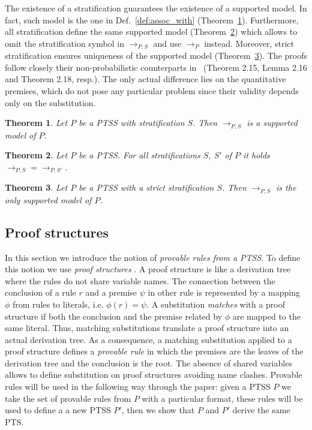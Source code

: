 \documentclass[submission,copyright,creativecommons]{eptcs}
\newtheorem{theorem}{Theorem}
\newcommand{\trans}[1][]{\xrightarrow{\, {#1} \, }}
\begin{document}
The  existence of a stratification guarantees the existence of a
supported model. In fact, such model is the one in
Def.~\ref{def:assoc_with} (Theorem~\ref{th:existence:supmodel}). Furthermore,
all stratification define the same supported model (Theorem~\ref{th:weakunicity:supmodel}) which allows to omit the stratification
symbol in ${\trans_{P, S}}$ and use ${\trans_{P}}$ instead. Moreover, 
strict stratification ensures uniqueness of the supported model 
(Theorem~\ref{th:strongunicity:supmodel}). The proofs follow closely
their non-probabilistic counterparts in~\cite{Groote93} (Theorem
2.15, Lemma 2.16 and Theorem 2.18, resp.).
The only actual difference lies on the quantitative premises, which do
not pose any particular problem since their validity depends only on
the substitution.


\begin{theorem}\label{th:existence:supmodel}Let $P$ be a PTSS with stratification $S$. Then $\trans_{P, S}$ is a supported model of $P$. 
\end{theorem}

\begin{theorem}\label{th:weakunicity:supmodel}Let $P$ be a PTSS. For all stratifications $S$, $S'$ of $P$ it holds ${\trans_{P, S}} =
  {\trans_{P, S'}}$.
\end{theorem}

\begin{theorem}\label{th:strongunicity:supmodel}Let $P$ be a PTSS with a strict stratification $S$. Then $\trans_{P, S}$ is the only supported model of $P$.
\end{theorem}


\subsection{Proof structures}\label{sec:proofStructure}


 In this section we introduce the notion of \emph{provable rules from a PTSS}.
To define this notion we use \emph{proof structures} \cite{FokkinkvanGlabbeek96}.
A proof structure is like a derivation tree where the rules do not share variable names. 
The connection between the conclusion of a rule $r$ 
 and a premise $\psi$ in other rule is represented by a mapping $\phi$ 
 from rules to literals, i.e. $\phi(r) = \psi$.
A substitution \emph{matches} with a proof structure if both 
 the conclusion and the premise related by $\phi$ are mapped to the same literal. 
Thus, matching substitutions translate a proof structure into an actual derivation tree.  As a consequence, a matching substitution applied to a proof structure defines a \emph{provable rule} in which the premises
 are the leaves of the derivation tree and the conclusion is the root.
The absence of shared variables allows to 
 define substitution on proof structures avoiding name clashes.
Provable rules will be used in the following way through the paper:  
 given a PTSS $P$ we take the set of provable rules from $P$ 
 with a particular format, these rules will be used to define a 
 a new PTSS $P'$, then we show that $P$ and $P'$ derive the same 
 PTS.
\end{document}
